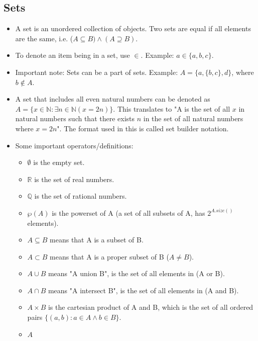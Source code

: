 \subsection{Sets}

\begin{itemize}
    \item A set is an unordered collection of objects. Two sets are equal if all elements are the same, i.e. ($A \subseteq B) \wedge (A \supseteq B)$.
    
    \item To denote an item being in a set, use $\in$. Example: $a \in \{a, b, c\}$.
    
    \item Important note: Sets can be a part of sets. Example: $A = \{a, \{b, c\}, d\}$, where $b \notin A$.
    
    \item A set that includes all even natural numbers can be denoted as $A = \{x \in \mathbb{N} : \exists n \in \mathbb{N} (x = 2n) \}$. This translates to "A is the set of all $x$ in natural numbers such that there exists $n$ in the set of all natural numbers where $x = 2n$". The format used in this is called set builder notation.
    
    \item Some important operators/definitions:
        \begin{itemize}
            \item $\emptyset$ is the empty set.
            \item $\mathbb{R}$ is the set of real numbers.
            \item $\mathbb{Q}$ is the set of rational numbers.
            \item $\wp (A)$ is the powerset of A (a set of all subsets of A, has $2^{A.size()}$ elements).
            \item $A \subseteq B$ means that A is a subset of B.
            \item $A \subset B$ means that A is a proper subset of B ($A \ne B$).
            \item $A \cup B$ means "A union B", is the set of all elements in (A or B).
            \item $A \cap B$ means "A intersect B", is the set of all elements in (A and B).
            \item $A \times B$ is the cartesian product of A and B, which is the set of all ordered pairs $\{(a, b) : a \in A \wedge b \in B\}$.
            \item $A $
        \end{itemize}

    
\end{itemize}